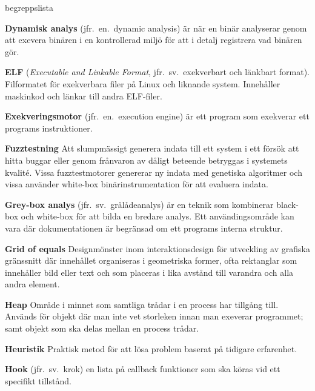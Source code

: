 \begin{labeling}{begreppslista}
    \item [\textbf{Dynamisk analys}] (jfr.\ en.\ dynamic analysis) är
    när en binär analyserar genom att exevera binären i en
    kontrollerad miljö för att i detalj registrera vad binären
    gör.

    \item [\textbf{ELF}] (\emph{Executable and Linkable Format},
          jfr.\ sv.\ exekverbart och länkbart format). Filformatet för
    exekverbara filer på Linux och liknande system. Innehåller
    maskinkod och länkar till andra ELF-filer.

    \item [\textbf{Exekveringsmotor}] (jfr.\ en.\ execution engine) är
    ett program som exekverar ett programs instruktioner.

    \item [\textbf{Fuzztestning}] Att slumpmässigt generera indata
    till ett system i ett försök att hitta buggar eller genom
    frånvaron av dåligt beteende betryggas i systemets
    kvalité. Vissa fuzztestmotorer genererar ny indata med
    genetiska algoritmer och vissa använder white-box
    binärinstrumentation för att evaluera indata.

    \item [\textbf{Grey-box analys}] (jfr.\ sv.\ grålådeanalys) är en
    teknik som kombinerar black-box och white-box för att bilda en
    bredare analys. Ett användingsområde kan vara där
    dokumentationen är begränsad om ett programs interna struktur.

    \item [\textbf{Grid of equals}] Designmönster inom
    interaktionsdesign för utveckling av grafiska gränssnitt där
    innehållet organiseras i geometriska former, ofta rektanglar
    som innehåller bild eller text och som placeras i lika avstånd
    till varandra och alla andra element.

    \item [\textbf{Heap}] Område i minnet som samtliga trådar i en
    process har tillgång till. Används för objekt där man inte vet
    storleken innan man exeverar programmet; samt objekt som ska
    delas mellan en process trådar.

    \item [\textbf{Heuristik}] Praktisk metod för att lösa problem
    baserat på tidigare erfarenhet.

    \item [\textbf{Hook}] (jfr.\ sv.\ krok) en lista på callback
    funktioner som ska köras vid ett specifikt tillstånd.


\end{labeling}
